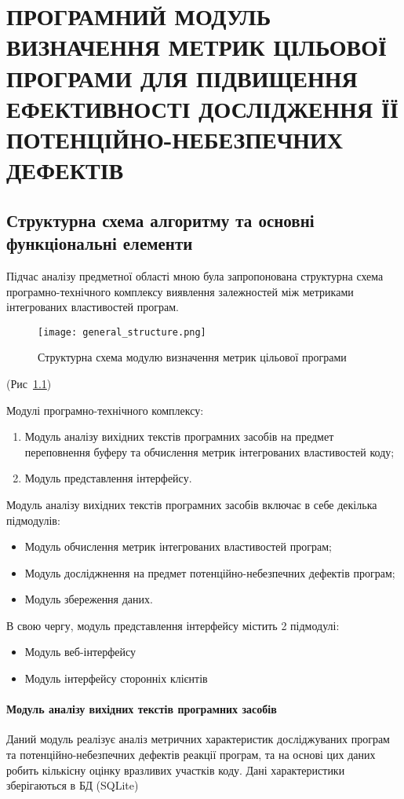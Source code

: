 \chapter{ПРОГРАМНИЙ МОДУЛЬ ВИЗНАЧЕННЯ МЕТРИК ЦІЛЬОВОЇ ПРОГРАМИ ДЛЯ ПІДВИЩЕННЯ ЕФЕКТИВНОСТІ ДОСЛІДЖЕННЯ ЇЇ ПОТЕНЦІЙНО-НЕБЕЗПЕЧНИХ ДЕФЕКТІВ}
\label{3section::doc}\label{3section:id1}

\section{Структурна схема алгоритму та основні функціональні елементи}
\label{3section:id2}
Підчас аналізу предметної області мною була запропонована структурна схема програмно-технічного комплексу виявлення залежностей між метриками інтегрованих властивостей програм.
\begin{figure} [h]
    \centering
    \texttt{[image: general\_structure.png]}
    \caption{Структурна схема модулю визначення метрик цільової програми}
    \label{fig:general_structure}
\end{figure}
(Рис \,\ref{fig:general_structure})

Модулі програмно-технічного комплексу:
\begin{enumerate}
 \item Модуль аналізу вихідних текстів програмних засобів на предмет переповнення буферу та обчислення метрик інтегрованих властивостей коду;
 \item Модуль представлення інтерфейсу.
\end{enumerate}

Модуль аналізу вихідних текстів програмних засобів включає в себе декілька підмодулів:
\begin{itemize}
 \item Модуль обчислення метрик інтегрованих властивостей програм;
 \item Модуль досліджнення на предмет потенційно-небезпечних дефектів програм;
 \item Модуль збереження даних.
\end{itemize}

В свою чергу, модуль представлення інтерфейсу містить 2 підмодулі:
\begin{itemize}
 \item Модуль веб-інтерфейсу
 \item Модуль інтерфейсу сторонніх клієнтів
\end{itemize}

\subsubsection{Модуль аналізу вихідних текстів програмних засобів}
\label{module_analize}
Даний модуль реалізує аналіз метричних характеристик досліджуваних програм та потенційно-небезпечних дефектів реакції програм, та на основі цих даних робить кількісну оцінку вразливих участків коду. Дані характеристики зберігаються в БД (SQLite)

